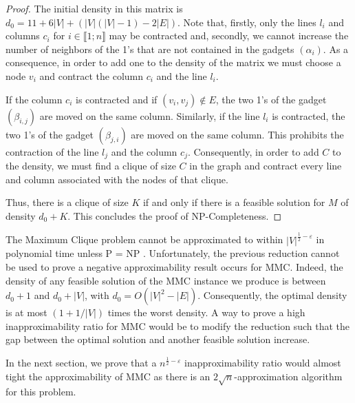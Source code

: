 \begin{proof}



The initial density in this matrix is $d_0 = 11 + 6|V| + (|V| (|V|-1) - 2|E|)$. Note that, firstly, only the lines $l_i$ and columns $c_i$ for $i \in \llbracket 1;n \rrbracket$ may be contracted and, secondly, we cannot increase the number of neighbors of the 1's that are not contained in the gadgets $(\alpha_i)$. As a consequence, in order to add one to the density of the matrix we must choose a node $v_i$ and contract the column $c_i$ and the line $l_i$. 

If the column $c_i$ is contracted and if $(v_i, v_j) \not \in E$, the two 1's of the gadget $(\beta_{i,j})$ are moved on the same column. Similarly, if the line $l_i$ is contracted, the two 1's of the gadget $(\beta_{j,i})$ are moved on the same column. This prohibits the contraction of the line $l_j$ and the column $c_j$. Consequently, in order to add $C$ to the density, we must find a clique of size $C$ in the graph and contract every line and column associated with the nodes of that clique.

Thus, there is a clique of size $K$ if and only if there is a feasible solution for $M$ of density $d_0 + K$. This concludes the proof of NP-Completeness.

\end{proof}
  
The Maximum Clique problem cannot be approximated to within $|V|^{\frac{1}{2} - \varepsilon}$ in polynomial time unless P = NP \cite{Hastad1999}. Unfortunately, the previous reduction cannot be used to prove a negative approximability result occurs for MMC. Indeed, the density of any feasible solution of the MMC instance we produce is between $d_0 + 1$ and $d_0 + |V|$, with $d_0 = O(|V|^2 - |E|)$. Consequently, the optimal density is at most $(1 + 1/|V|)$ times the worst density. A way to prove a high inapproximability ratio for MMC would be to modify the reduction such that the gap between the optimal solution and another feasible solution increase.

In the next section, we prove that a $n^{\frac{1}{2} - \varepsilon}$ inapproximability ratio would almost tight the approximability of MMC as there is an $2\sqrt{n}$-approximation algorithm for this problem.
